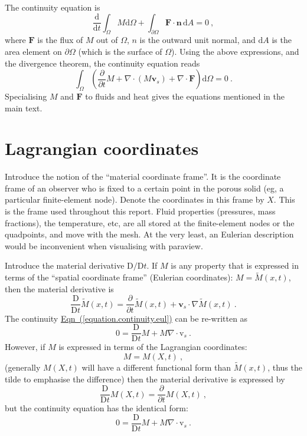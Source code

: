 \documentclass[12pt]{report}
\def\d{\mathrm{d}}
\begin{document}
The continuity equation is
\begin{equation}
\frac{\d}{\d t}\int_{\Omega}M \d\Omega + \int_{\partial
  \Omega}{\mathbf F}\cdot{\mathbf n}\,\d A = 0 \ ,
\end{equation}
where ${\mathbf F}$ is the flux of $M$ out of $\Omega$, $n$ is the
outward unit normal, and $\d A$ is the area element on
$\partial\Omega$ (which is the surface of $\Omega$).  Using the above
expressions, and the divergence theorem, the continuity equation reads
\begin{equation}
\int_{\Omega} \left( \frac{\partial}{\partial t}M + \nabla\cdot(M{\mathbf
  v}_{s}) + \nabla\cdot{\mathbf F}  \right)\d\Omega = 0 \ .
\label{equation.continuity.eul}
\end{equation}
Specialising $M$ and ${\mathbf F}$ to fluids and heat gives the
equations mentioned in the main text.


\section{Lagrangian coordinates}

Introduce the notion of the ``material coordinate frame''.  It is the
coordinate frame of an observer who is fixed to a certain point in the
porous solid (eg, a particular finite-element node).  Denote the
coordinates in this frame by $X$.  This is the
frame used throughout this report.  Fluid properties (pressures, mass
fractions), the temperature, etc, are all stored at the finite-element
nodes or the quadpoints, and move with the mesh.  At the very least,
an Eulerian description would be inconvenient when visualising with
paraview.

Introduce the material derivative $\mathrm{D}/\mathrm{D} t$.  If $M$
is any property that is expressed in terms of the ``spatial coordinate
frame'' (Eulerian coordinates): $M=\tilde{M}(x,t)$, then the material
derivative is
\begin{equation}
\frac{\mathrm{D}}{\mathrm{D} t}\tilde{M}(x, t) = \frac{\partial
}{\partial t}\tilde{M}(x, t) + {\mathbf{v}}_{s}\cdot \nabla
\tilde{M}(x, t)\ .
\end{equation}
The continuity
\hyperref[equation.continuity.eul]{Eqn~(\ref*{equation.continuity.eul})}
can be re-written as
\begin{equation}
0 = \frac{\mathrm{D}}{\mathrm{D} t}M + M\nabla\cdot {\mathrm{v}}_{s}
\ .
\end{equation}
However, if $M$ is expressed in terms of the Lagrangian coordinates:
\begin{equation}
M = M(X, t) \ ,
\end{equation}
(generally $M(X, t)$ will have a different functional form than
$\tilde{M}(x,t)$, thus the tilde to emphasise the difference)
then the material derivative is expressed by
\begin{equation}
\frac{\mathrm{D}}{\mathrm{D} t}M(X, t) = \frac{\partial}{\partial
  t}M(X, t) \ ,
\end{equation}
but the continuity equation has the identical form:
\begin{equation}
0 = \frac{\mathrm{D}}{\mathrm{D} t}M + M\nabla\cdot {\mathrm{v}}_{s}
\ .
\end{equation}
\end{document}
